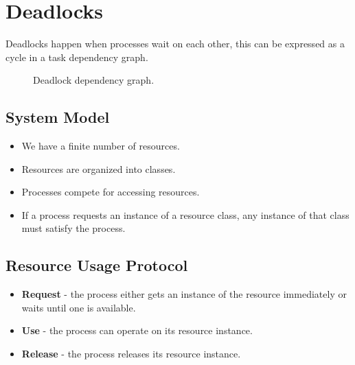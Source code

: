 \section{Deadlocks}

Deadlocks happen when processes wait on each other,
this can be expressed as a cycle in a task dependency graph.

\begin{figure}
    \centering
    \caption{Deadlock dependency graph.}
    \label{fig:deadlock}
\end{figure}

\subsection{System Model}
\begin{itemize}
    \item We have a finite number of resources.
    \item Resources are organized into classes.
    \item Processes compete for accessing resources.
    \item If a process requests an instance of a resource class,
    any instance of that class must satisfy the process.
\end{itemize}

\subsection{Resource Usage Protocol}
\begin{itemize}
    \item \textbf{Request} - the process either gets an instance of the resource immediately or waits until one is available.
    \item \textbf{Use} - the process can operate on its resource instance.
    \item \textbf{Release} - the process releases its resource instance.
\end{itemize}

